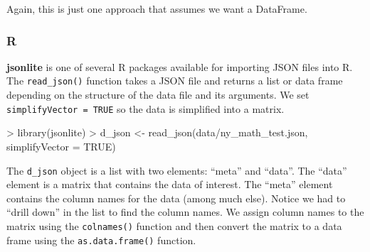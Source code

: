 \documentclass[
]{book}
\newenvironment{Shaded}{\begin{snugshade}}{\end{snugshade}}
\newcommand{\AttributeTok}[1]{\textcolor[rgb]{0.77,0.63,0.00}{#1}}
\newcommand{\ConstantTok}[1]{\textcolor[rgb]{0.00,0.00,0.00}{#1}}
\newcommand{\DecValTok}[1]{\textcolor[rgb]{0.00,0.00,0.81}{#1}}
\newcommand{\FunctionTok}[1]{\textcolor[rgb]{0.00,0.00,0.00}{#1}}
\newcommand{\NormalTok}[1]{#1}
\newcommand{\OtherTok}[1]{\textcolor[rgb]{0.56,0.35,0.01}{#1}}
\newcommand{\SpecialCharTok}[1]{\textcolor[rgb]{0.00,0.00,0.00}{#1}}
\newcommand{\StringTok}[1]{\textcolor[rgb]{0.31,0.60,0.02}{#1}}
\begin{document}
Again, this is just one approach that assumes we want a DataFrame.

\hypertarget{r-14}{%
\subsubsection*{R}\label{r-14}}

\textbf{jsonlite} is one of several R packages available for importing JSON files into R. The \texttt{read\_json()} function takes a JSON file and returns a list or data frame depending on the structure of the data file and its arguments. We set \texttt{simplifyVector\ =\ TRUE} so the data is simplified into a matrix.

\begin{Shaded}
\begin{Highlighting}[]
\SpecialCharTok{\textgreater{}} \FunctionTok{library}\NormalTok{(jsonlite)}
\SpecialCharTok{\textgreater{}}\NormalTok{ d\_json }\OtherTok{\textless{}{-}} \FunctionTok{read\_json}\NormalTok{(}\StringTok{\textquotesingle{}data/ny\_math\_test.json\textquotesingle{}}\NormalTok{, }\AttributeTok{simplifyVector =} \ConstantTok{TRUE}\NormalTok{)}
\end{Highlighting}
\end{Shaded}

The \texttt{d\_json} object is a list with two elements: ``meta'' and ``data''. The ``data'' element is a matrix that contains the data of interest. The ``meta'' element contains the column names for the data (among much else). Notice we had to ``drill down'' in the list to find the column names. We assign column names to the matrix using the \texttt{colnames()} function and then convert the matrix to a data frame using the \texttt{as.data.frame()} function.

\begin{Shaded}
\end{Shaded}
\end{document}
